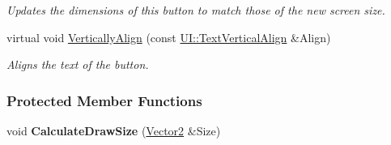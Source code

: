 \begin{DoxyCompactItemize}
\begin{DoxyCompactList}\small\item\em Updates the dimensions of this button to match those of the new screen size. \item\end{DoxyCompactList}\item 
virtual void \hyperlink{classMezzanine_1_1UI_1_1TextButton_aa3f101b72211c2296c0709c183edc6db}{VerticallyAlign} (const \hyperlink{namespaceMezzanine_1_1UI_ab35e3845e2541698245262cc17147ae9}{UI::TextVerticalAlign} \&Align)
\begin{DoxyCompactList}\small\item\em Aligns the text of the button. \item\end{DoxyCompactList}\end{DoxyCompactItemize}
\subsubsection*{Protected Member Functions}
\begin{DoxyCompactItemize}
\item 
\hypertarget{classMezzanine_1_1UI_1_1TextButton_af0838f62bde14a42065af446cd6e241d}{
void {\bfseries CalculateDrawSize} (\hyperlink{classMezzanine_1_1Vector2}{Vector2} \&Size)}
\label{classMezzanine_1_1UI_1_1TextButton_af0838f62bde14a42065af446cd6e241d}

\end{DoxyCompactItemize}
